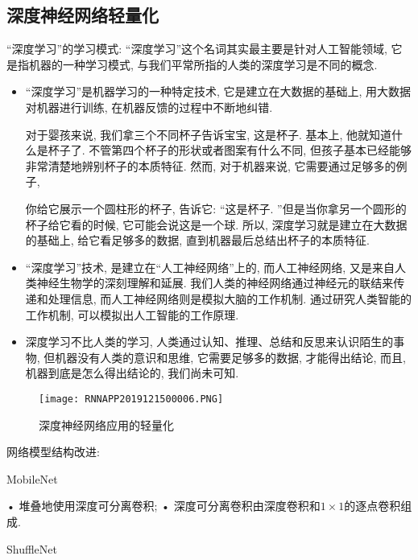 \subsection{深度神经网络轻量化}
“深度学习”的学习模式: “深度学习”这个名词其实最主要是针对人工智能领域, 它是指机器的一种学习模式, 与我们平常所指的人类的深度学习是不同的概念.
\begin{itemize}
\item “深度学习”是机器学习的一种特定技术, 它是建立在大数据的基础上, 用大数据对机器进行训练, 在机器反馈的过程中不断地纠错.
\begin{example}
对于婴孩来说, 我们拿三个不同杯子告诉宝宝, 这是杯子. 基本上, 他就知道什么是杯子了. 不管第四个杯子的形状或者图案有什么不同, 但孩子基本已经能够非常清楚地辨别杯子的本质特征.
然而, 对于机器来说, 它需要通过足够多的例子,
\end{example}
\begin{example}
你给它展示一个圆柱形的杯子, 告诉它: “这是杯子. ”但是当你拿另一个圆形的杯子给它看的时候, 它可能会说这是一个球. 所以, 深度学习就是建立在大数据的基础上, 给它看足够多的数据, 直到机器最后总结出杯子的本质特征.
\end{example}
\item “深度学习”技术, 是建立在“人工神经网络”上的, 而人工神经网络, 又是来自人类神经生物学的深刻理解和延展. 我们人类的神经网络通过神经元的联结来传递和处理信息, 而人工神经网络则是模拟大脑的工作机制.
通过研究人类智能的工作机制, 可以模拟出人工智能的工作原理.

\item 深度学习不比人类的学习, 人类通过认知、推理、总结和反思来认识陌生的事物, 但机器没有人类的意识和思维, 它需要足够多的数据, 才能得出结论, 而且, 机器到底是怎么得出结论的, 我们尚未可知.
\end{itemize}
\begin{figure}[H]
\centering
\texttt{[image: RNNAPP2019121500006.PNG]}
\caption{深度神经网络应用的轻量化}
\label{RNNAPP2019121500006}\vspace{-0.4cm}
\end{figure}

网络模型结构改进:

MobileNet

• 堆叠地使用深度可分离卷积;
• 深度可分离卷积由深度卷积和$1\times 1$的逐点卷积组成.

ShuffleNet

